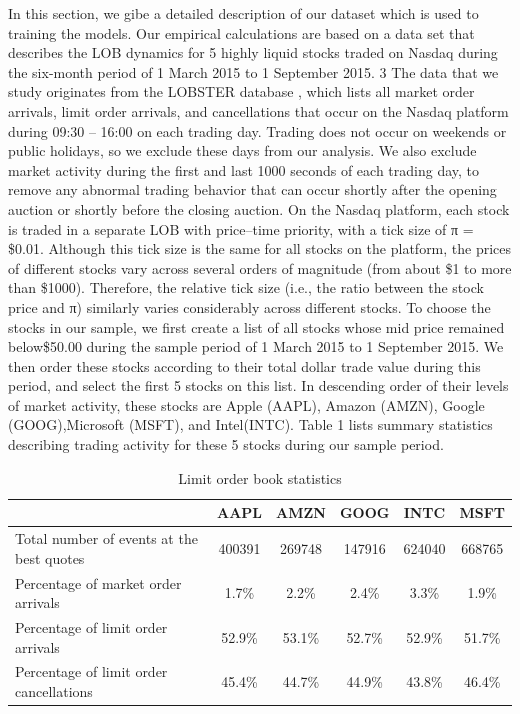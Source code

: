 In this section, we gibe a detailed description of our dataset which is used to training the models. Our empirical calculations are based on a data set that describes the LOB dynamics for 5 highly liquid stocks traded on Nasdaq during the six-month period of 1 March 2015 to 1 September 2015. 3 The data
that we study originates from the LOBSTER database \cite{huang2015simulating}, which lists all market order arrivals, limit order arrivals, and cancellations that occur on the Nasdaq platform during 09:30 – 16:00 on each trading day. Trading does not occur on weekends or public holidays, so we exclude these days from our analysis. We also exclude market activity during the first and last 1000 seconds of each trading day, to remove any abnormal trading behavior that can occur shortly after the opening auction or shortly before the closing auction. On the Nasdaq platform, each stock is traded in a separate LOB with price–time priority, with a tick size of π = \$0.01. Although this tick size is the same for all stocks on the platform, the prices of
different stocks vary across several orders of magnitude (from about \$1 to more than \$1000). Therefore, the
relative tick size (i.e., the ratio between the stock price and π) similarly varies considerably across different stocks.
To choose the stocks in our sample, we first create a list of all stocks whose mid price remained below\$50.00 during the sample period of 1 March 2015 to 1 September 2015. We then order these stocks according
to their total dollar trade value during this period, and select the first 5 stocks on this list. In descending
order of their levels of market activity, these stocks are Apple (AAPL), Amazon (AMZN), Google (GOOG),Microsoft (MSFT), and  Intel(INTC). Table 1 lists summary statistics describing trading activity
for these 5 stocks during our sample period.
\begin{table}
	\caption{Limit order book statistics}
	\label{sonnets}
	\begin{center}
		\begin{tabular}{|l|c|c|c|c|c|}
			\hline
			 & AAPL & AMZN & GOOG & INTC & MSFT\\[5pt]
			 \hline
		Total number of events at the best quotes& 400391 & 269748 & 147916 & 624040 & 668765 \\[5pt]
			Percentage of market order arrivals & 1.7\% & 2.2\% & 2.4\% & 3.3\% & 1.9\% \\[5pt]
		Percentage of limit order arrivals& 52.9\% & 53.1\% & 52.7\% & 52.9\%& 51.7\%\\[5pt]
			Percentage of limit order cancellations & 45.4\% & 44.7\% & 44.9\% & 43.8\% & 46.4\%\\
			\hline 
		\end{tabular}
	\end{center}
\end{table}
